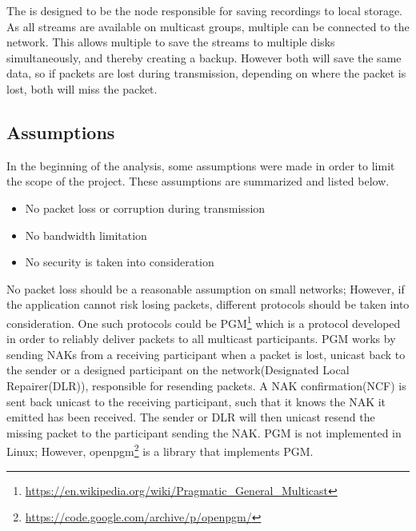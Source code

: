 The \hist{} is designed to be the node responsible for saving recordings to local storage. As all streams are available on multicast groups, multiple  can be connected to the network. This allows multiple  to save the streams to multiple disks simultaneously, and thereby creating a backup. However both  will save the same data, so if packets are lost during transmission, depending on where the packet is lost, both  will miss the packet.\\

\subsection{Assumptions}
\noindent{}In the beginning of the analysis, some assumptions were made in order to limit the scope of the project. These assumptions are summarized and listed below.
\begin{itemize}
	\item No packet loss or corruption during transmission
	\item No bandwidth limitation
	\item No security is taken into consideration
\end{itemize}

No packet loss should be a reasonable assumption on small networks; However, if the application cannot risk losing packets, different protocols should be taken into consideration.
One such protocols could be \ac{PGM}\footnote{\url{https://en.wikipedia.org/wiki/Pragmatic\_General\_Multicast}} which is a protocol developed in order to reliably deliver packets to all multicast participants.
PGM works by sending NAKs from a receiving participant when a packet is lost, unicast back to the sender or a designed participant on the network(Designated Local Repairer(DLR)), responsible for resending packets. A NAK confirmation(NCF) is sent back unicast to the receiving participant, such that it knows the NAK it emitted has been received. The sender or DLR will then unicast resend the missing packet to the participant sending the NAK. PGM is not implemented in Linux; However, openpgm\footnote{\url{https://code.google.com/archive/p/openpgm/}} is a library that implements PGM.\\


